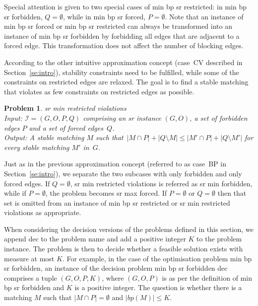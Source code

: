\documentclass[preprint,12pt]{elsarticle}
\newtheorem{pr}[theorem]{Problem}
\begin{document}
Special attention is given to two special cases of {\sc min bp sr restricted}: in {\sc min bp sr forbidden}, $Q = \emptyset$, while in {\sc min bp sr forced}, $P = \emptyset$. Note that an instance of {\sc min bp sr forced} or {\sc min bp sr restricted} can always be transformed into an instance of {\sc min bp sr forbidden} by forbidding all edges that are adjacent to a forced edge. This transformation does not affect the number of blocking edges.

According to the other intuitive approximation concept (case~CV described in Section~\ref{se:intro}), stability constraints need to be fulfilled, while some of the constraints on restricted edges are relaxed. The goal is to find a stable matching that violates as few constraints on restricted edges as possible.

\begin{pr}{\sc sr min restricted violations} \ \\
	Input: $\mathcal{I} = (G, O, P, Q)$ comprising an {\sc sr} instance $(G,O)$, a set of forbidden edges $P$ and a set of forced edges~$Q$. \\
	Output: A stable matching $M$ such that~$|M \cap P| +|Q \setminus M| \leq |M' \cap P| + |Q \setminus M'|$ for every stable matching $M'$ in~$G$.
\end{pr}

Just as in the previous approximation concept (referred to as case~BP in Section~\ref{se:intro}), we separate the two subcases with only forbidden and only forced edges. If $Q = \emptyset$, {\sc sr min restricted violations} is referred as {\sc sr min forbidden}, while if $P = \emptyset$, the problem becomes {\sc sr max forced}.  If $P=\emptyset$ or $Q=\emptyset$ then that set is omitted from an instance of {\sc min bp sr restricted} or {\sc sr min restricted violations} as appropriate.

When considering the decision versions of the problems defined in this section, we append {\sc dec} to the problem name and add a positive integer $K$ to the problem instance.  The problem is then to decide whether a feasible solution exists with measure at most $K$.  For example, in the case of the optimisation problem {\sc min bp sr forbidden}, an instance of the decision problem {\sc min bp sr forbidden dec} comprises a tuple $(G,O,P,K)$, where $(G,O,P)$ is as per the definition of {\sc min bp sr forbidden} and $K$ is a positive integer.  The question is whether there is a matching $M$ such that $|M\cap P|=\emptyset$ and $|bp(M)|\leq K$. 
\end{document}

